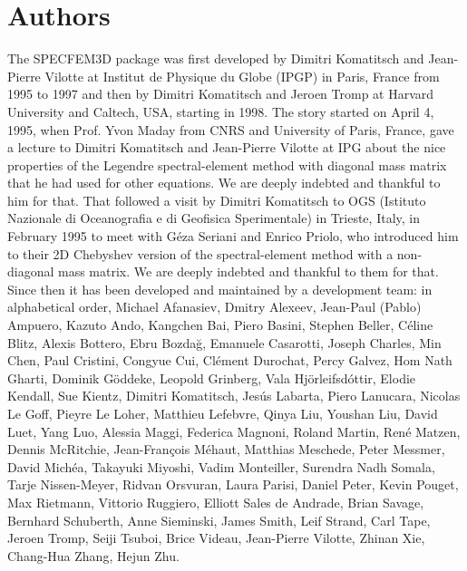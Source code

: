 \section*{Authors}

\noindent The SPECFEM3D package was first developed by Dimitri
Komatitsch and Jean-Pierre Vilotte at Institut de Physique du Globe
(IPGP) in Paris, France from 1995 to 1997 and then by Dimitri Komatitsch
and Jeroen Tromp at Harvard University and Caltech, USA, starting in 1998.
The story started on April 4, 1995, when Prof. Yvon Maday from CNRS and University of Paris, France, gave a lecture to
Dimitri Komatitsch and Jean-Pierre Vilotte at IPG about the nice properties of the Legendre spectral-element method with diagonal mass matrix that he had used for
other equations. We are deeply indebted and thankful to him for that.
That followed a visit by Dimitri Komatitsch to OGS (Istituto Nazionale di Oceanografia e di Geofisica Sperimentale) in Trieste, Italy, in February 1995
to meet with G\'eza Seriani and Enrico Priolo, who introduced him to their 2D Chebyshev version of the spectral-element method with a non-diagonal mass matrix.
We are deeply indebted and thankful to them for that.\\

Since then it has been developed and maintained by a development team: in alphabetical order,
Michael Afanasiev,
Dmitry Alexeev,
Jean-Paul (Pablo) Ampuero,
Kazuto Ando,
Kangchen Bai,
Piero Basini,
Stephen Beller,
C\'eline Blitz,
Alexis Bottero,
Ebru Bozda\u{g},
Emanuele Casarotti,
Joseph Charles,
Min Chen,
Paul Cristini,
Congyue Cui,
Cl\'ement Durochat,
Percy Galvez,
Hom Nath Gharti,
Dominik G\"oddeke,
Leopold Grinberg,
Vala Hj\"orleifsd\'ottir,
Elodie Kendall,
Sue Kientz,
Dimitri Komatitsch,
Jes\'us Labarta,
Piero Lanucara,
Nicolas Le Goff,
Pieyre Le Loher,
Matthieu Lefebvre,
Qinya Liu,
Youshan Liu,
David Luet,
Yang Luo,
Alessia Maggi,
Federica Magnoni,
Roland Martin,
Ren\'e Matzen,
Dennis McRitchie,
Jean-Fran\c{c}ois M\'ehaut,
Matthias Meschede,
Peter Messmer,
David Mich\'ea,
Takayuki Miyoshi,
Vadim Monteiller,
Surendra Nadh Somala,
Tarje Nissen-Meyer,
Ridvan Orsvuran,
Laura Parisi,
Daniel Peter,
Kevin Pouget,
Max Rietmann,
Vittorio Ruggiero,
Elliott Sales de Andrade,
Brian Savage,
Bernhard Schuberth,
Anne Sieminski,
James Smith,
Leif Strand,
Carl Tape,
Jeroen Tromp,
Seiji Tsuboi,
Brice Videau,
Jean-Pierre Vilotte,
Zhinan Xie,
Chang-Hua Zhang,
Hejun Zhu.\\


